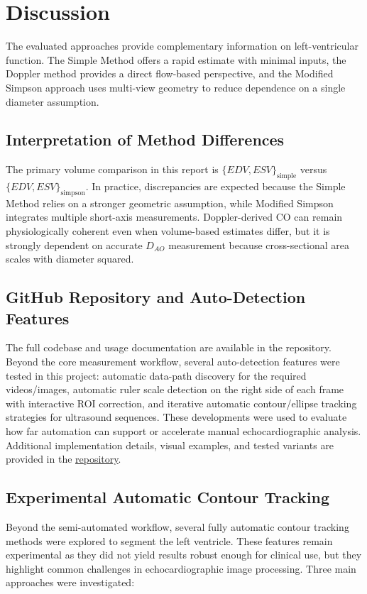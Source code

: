 \section{Discussion}
The evaluated approaches provide complementary information on left-ventricular function. The Simple Method offers a rapid estimate with minimal inputs, the Doppler method provides a direct flow-based perspective, and the Modified Simpson approach uses multi-view geometry to reduce dependence on a single diameter assumption.

\subsection{Interpretation of Method Differences}
The primary volume comparison in this report is $\{EDV,ESV\}_{\mathrm{simple}}$ versus $\{EDV,ESV\}_{\mathrm{simpson}}$. In practice, discrepancies are expected because the Simple Method relies on a stronger geometric assumption, while Modified Simpson integrates multiple short-axis measurements. Doppler-derived CO can remain physiologically coherent even when volume-based estimates differ, but it is strongly dependent on accurate $D_{AO}$ measurement because cross-sectional area scales with diameter squared.

\subsection{GitHub Repository and Auto-Detection Features}
The full codebase and usage documentation are available in the repository.
Beyond the core measurement workflow, several auto-detection features were tested in this project: automatic data-path discovery for the required videos/images, automatic ruler scale detection on the right side of each frame with interactive ROI correction, and iterative automatic contour/ellipse tracking strategies for ultrasound sequences. These developments were used to evaluate how far automation can support or accelerate manual echocardiographic analysis. Additional implementation details, visual examples, and tested variants are provided in the \href{https://github.com/ThomasMoulin-hub/Echocardiography-Auto-Volume-Analyzer}{\uline{repository}}.

\subsection{Experimental Automatic Contour Tracking}
Beyond the semi-automated workflow, several fully automatic contour tracking methods were explored to segment the left ventricle. These features remain experimental as they did not yield results robust enough for clinical use, but they highlight common challenges in echocardiographic image processing. Three main approaches were investigated:

